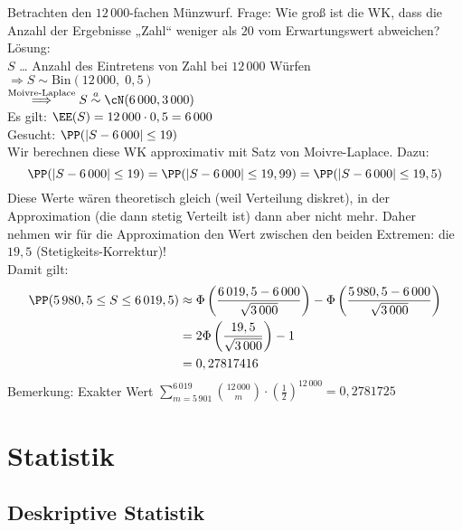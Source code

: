  Betrachten den $12\, 000$-fachen Münzwurf. Frage: Wie groß ist die WK, dass die Anzahl der Ergebnisse „Zahl“ weniger als $20$ vom Erwartungswert abweichen?\\
Lösung:\\
$S$ … Anzahl des Eintretens von Zahl bei $12\, 000$ Würfen\\
$\Rightarrow S\sim \mathrm{Bin}(12\,000,\; 0,5)$\\
$\overset{\text{Moivre-Laplace}}{\Longrightarrow} S \overset{a}{\sim} \cN (6\,000, 3\,000)$\\
Es gilt: $\EE(S)=12\,000 \cdot 0,5 = 6\,000$\\
Gesucht: $\PP(|S-6\,000|\leq 19)$\\
Wir berechnen diese WK approximativ mit Satz von Moivre-Laplace. Dazu: 
$$\PP(|S-6\,000|\leq 19)=\PP(|S-6\,000|\leq 19,99) = \PP(|S-6\,000|\leq 19,5)$$
Diese Werte wären theoretisch gleich (weil Verteilung diskret), in der Approximation (die dann stetig Verteilt ist) dann aber nicht mehr. Daher nehmen wir für die Approximation den Wert zwischen den beiden Extremen: die $19,5$ (Stetigkeits-Korrektur)!\\
Damit gilt:
\begin{align*}
\PP(5\,980,5 \leq S \leq 6\,019,5)&\approx \Phi\left(\frac{6\,019,5-6\,000}{\sqrt{3\,000}}\right) - \Phi \left( \frac{5\,980,5-6\,000}{\sqrt{3\,000}}\right) \\
&= 2 \Phi \left( \frac{19,5}{\sqrt{3\,000}}\right)-1 \\
&= 0,27817416
\end{align*}
Bemerkung: Exakter Wert $\sum_{m=5\,901}^{6\,019} \binom{12\,000}{m}\cdot \left(\frac{1}{2}\right)^{12\,000}=0,2781725$

\chapter{Statistik}
\section{Deskriptive Statistik}
